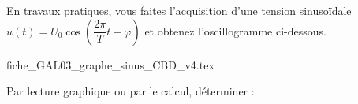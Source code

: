 

\finEntrainement






\newpage







\hauteurLargeurCadreReponse		{8mm}{2.5cm}
\initialisationEntrainement



En travaux pratiques, vous faites l'acquisition d'une tension sinusoïdale $u(t)=U_0\cos\left(\dfrac{2\pi}{T}t+\varphi\right)$ et obtenez l'oscillogramme ci-dessous. 

\def\ratioGraphiqueX{1.1}
\def\ratioGraphiqueY{0.7}

\begin{center}
{fiche_GAL03_graphe_sinus_CBD_v4.tex}
\end{center}

Par lecture graphique ou par le calcul, déterminer :

\debutEntrainement


